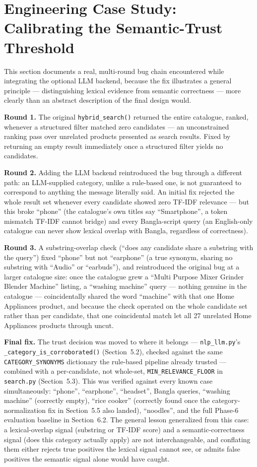 \documentclass[12pt,a4paper]{report}
\begin{document}
\section{Engineering Case Study: Calibrating the Semantic-Trust Threshold}
This section documents a real, multi-round bug chain encountered while integrating the optional LLM
backend, because the fix illustrates a general principle --- distinguishing lexical evidence from semantic
correctness --- more clearly than an abstract description of the final design would.

\textbf{Round 1.} The original \texttt{hybrid\_search()} returned the entire catalogue, ranked, whenever a
structured filter matched zero candidates --- an unconstrained ranking pass over unrelated products
presented as search results. Fixed by returning an empty result immediately once a structured filter
yields no candidates.

\textbf{Round 2.} Adding the LLM backend reintroduced the bug through a different path: an LLM-supplied
category, unlike a rule-based one, is not guaranteed to correspond to anything the message literally said.
An initial fix rejected the whole result set whenever every candidate showed zero TF-IDF relevance --- but
this broke ``phone'' (the catalogue's own titles say ``Smartphone'', a token mismatch TF-IDF cannot
bridge) and every Bangla-script query (an English-only catalogue can never show lexical overlap with
Bangla, regardless of correctness).

\textbf{Round 3.} A substring-overlap check (``does any candidate share a substring with the query'')
fixed ``phone'' but not ``earphone'' (a true synonym, sharing no substring with ``Audio'' or ``earbuds''),
and reintroduced the original bug at a larger catalogue size: once the catalogue grew a ``Multi Purpose
Mixer Grinder Blender Machine'' listing, a ``washing machine'' query --- nothing genuine in the catalogue
--- coincidentally shared the word ``machine'' with that one Home Appliances product, and because the check
operated on the whole candidate set rather than per candidate, that one coincidental match let all 27
unrelated Home Appliances products through uncut.

\textbf{Final fix.} The trust decision was moved to where it belongs --- \texttt{nlp\_llm.py}'s
\texttt{\_category\_is\_corroborated()} (Section~5.2), checked against the same
\texttt{CATEGORY\_SYNONYMS} dictionary the rule-based pipeline already trusted --- combined with a
per-candidate, not whole-set, \texttt{MIN\_RELEVANCE\_FLOOR} in \texttt{search.py} (Section~5.3). This was
verified against every known case simultaneously: ``phone'', ``earphone'', ``headset'', Bangla queries,
``washing machine'' (correctly empty), ``rice cooker'' (correctly found once the category-normalization
fix in Section~5.5 also landed), ``noodles'', and the full Phase-6 evaluation baseline in Section~6.2. The
general lesson generalized from this case: a lexical-overlap signal (substring or TF-IDF score) and a
semantic-correctness signal (does this category actually apply) are not interchangeable, and conflating
them either rejects true positives the lexical signal cannot see, or admits false positives the semantic
signal alone would have caught.
\end{document}
